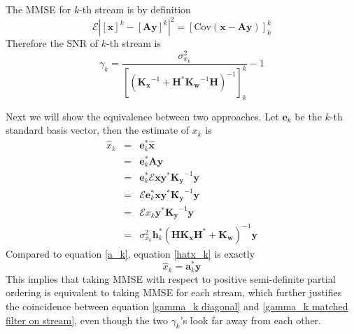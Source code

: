 \documentclass[12pt]{article}
\theoremstyle{definition}
\begin{document}
The MMSE for $k$-th stream is by definition
$$\mathcal{E}\left|[\bm{x}]^k-[\bm{Ay}]^k\right|^2=\left[\mbox{Cov}(\bm{x}-\bm{Ay})\right]_k^k$$
Therefore the SNR of $k$-th stream is
\begin{equation}
\gamma_k = \frac{\sigma_{x_k}^2}{\left[\left(\bm{K_x}^{-1}+\bm{H}^*\bm{K_w}^{-1}\bm{H}\right)^{-1}\right]_k^k}-1\label{gamma_k diagonal}
\end{equation}

Next we will show the equivalence between two approaches. Let $\bm{e}_k$ be the $k$-th standard basis vector, then the estimate of $x_k$ is 
\begin{eqnarray}
	\hat{x}_k&=&\bm{e}_k^*\hat{\bm{x}}\nonumber\\
	&=&\bm{e}_k^*\bm{Ay}\nonumber\\
	&=&\bm{e}_k^*\mathcal{E}\bm{xy}^*\bm{K_y}^{-1}\bm{y}\nonumber\\
	&=&\mathcal{E}\bm{e}_k^*\bm{xy}^*\bm{K_y}^{-1}\bm{y}\nonumber\\
	&=&\mathcal{E}x_k\bm{y}^*\bm{K_y}^{-1}\bm{y}\nonumber\\
	&=&\sigma_{x_k}^2\bm{h}_k^*\left(\bm{HK_xH}^*+\bm{K_w}\right)^{-1}\bm{y}\label{hatx_k}
\end{eqnarray}
Compared to equation \ref{a_k}, equation \ref{hatx_k} is exactly
$$\hat{x}_k=\bm{a}_k^*\bm{y}$$
This implies that taking MMSE with respect to positive semi-definite partial ordering is equivalent to taking MMSE for each stream, which further justifies the coincidence between equation \ref{gamma_k diagonal} and \ref{gamma_k matched filter on stream}, even though the two $\gamma_k$'s look far away from each other.
\end{document}
